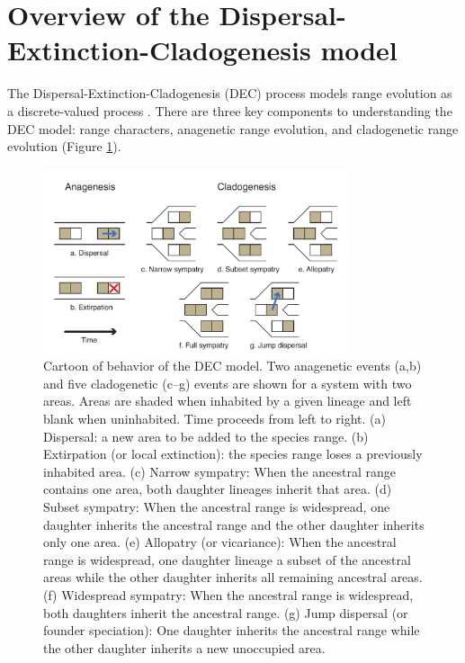\section{Overview of the Dispersal-Extinction-Cladogenesis model} \label{sec:bg_intro2}

The Dispersal-Extinction-Cladogenesis (DEC) process models range evolution as a discrete-valued process \citep{Ree2005, Ree2008}.
There are three key components to understanding the DEC model: range characters, anagenetic range evolution, and cladogenetic range evolution (Figure \ref{fig:dec_cartoon}).

\begin{figure}[!h]
\centering
\includegraphics[width=0.8\textwidth]{figures/fig_range_evol_events.pdf}
\caption{
Cartoon of behavior of the DEC model.
Two anagenetic events (a,b) and five cladogenetic (c--g) events are shown for a system with two areas.
Areas are shaded when inhabited by a given lineage and left blank when uninhabited.
Time proceeds from left to right.
(a) Dispersal: a new area to be added to the species range.
(b) Extirpation (or local extinction): the species range loses a previously inhabited area.
(c) Narrow sympatry: When the ancestral range contains one area, both daughter lineages inherit that area.
(d) Subset sympatry: When the ancestral range is widespread, one daughter inherits the ancestral range and the other daughter inherits only one area.
(e) Allopatry (or vicariance): When the ancestral range is widespread, one daughter lineage a subset of the ancestral areas while the other daughter inherits all remaining ancestral areas.
(f) Widespread sympatry: When the ancestral range is widespread, both daughters inherit the ancestral range.
(g) Jump dispersal (or founder speciation): One daughter inherits the ancestral range while the other daughter inherits a new unoccupied area.
}
\label{fig:dec_cartoon}
\end{figure}


